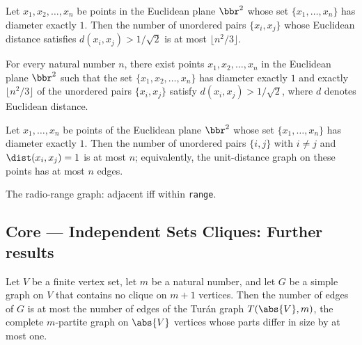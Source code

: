 \begin{theorem}
\label{SimpleGraph.card_farGraph_le}
Let $x_1, x_2, \ldots, x_n$ be points in the Euclidean plane $\bbr^2$ whose set $\{x_1,
\ldots, x_n\}$ has diameter exactly $1$. Then the number of unordered pairs $\{x_i,
x_j\}$ whose Euclidean distance satisfies $d(x_i, x_j) > 1/\sqrt{2}$ is at most $\lfloor
n^2/3 \rfloor$.
\end{theorem}

\begin{theorem}
\label{SimpleGraph.exists_farGraph_card_eq}
For every natural number $n$, there exist points $x_1, x_2, \ldots, x_n$ in the
Euclidean plane $\bbr^2$ such that the set $\{x_1, x_2, \ldots, x_n\}$ has diameter
exactly $1$ and exactly $\lfloor n^2/3\rfloor$ of the unordered pairs $\{x_i, x_j\}$
satisfy $d(x_i, x_j) > 1/\sqrt{2}$, where $d$ denotes Euclidean distance.
\end{theorem}

\begin{theorem}
\label{SimpleGraph.card_unitDistanceGraph_le_of_diam_one}
Let $x_1, \dots, x_n$ be points of the Euclidean plane $\bbr^2$ whose set $\{x_1, \dots,
x_n\}$ has diameter exactly $1$. Then the number of unordered pairs $\{i, j\}$ with $i
\ne j$ and $\dist(x_i, x_j) = 1$ is at most $n$; equivalently, the unit-distance graph
on these points has at most $n$ edges.
\end{theorem}

\begin{definition}
\label{SimpleGraph.radioGraph}
\leanok
The radio-range graph: adjacent iff within \texttt{range}.
\end{definition}

\subsection*{Core --- Independent Sets Cliques: Further results}

\begin{theorem}
\label{SimpleGraph.turan_edge_bound}
Let $V$ be a finite vertex set, let $m$ be a natural number, and let $G$ be a simple
graph on $V$ that contains no clique on $m+1$ vertices. Then the number of edges of $G$
is at most the number of edges of the Turán graph $T(\abs{V}, m)$, the complete
$m$-partite graph on $\abs{V}$ vertices whose parts differ in size by at most one.
\end{theorem}
